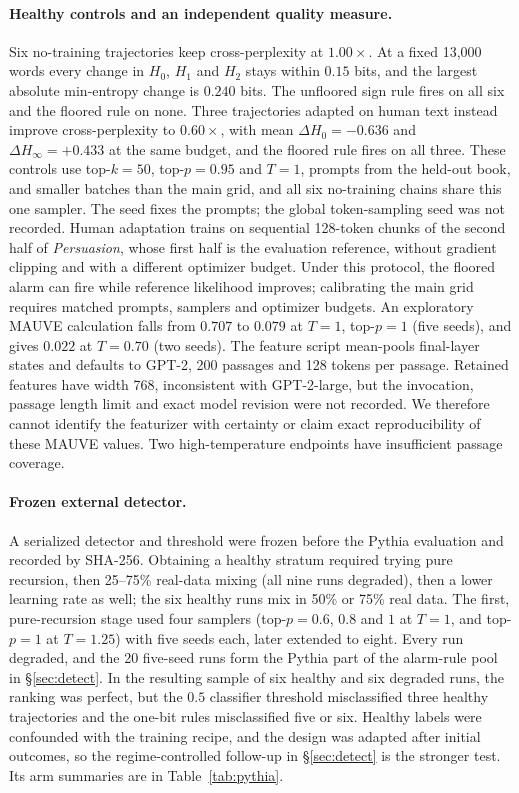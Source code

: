 \documentclass[10pt]{article}
\theoremstyle{plain}
\theoremstyle{definition}
\begin{document}
\paragraph{Healthy controls and an independent quality measure.} Six no-training trajectories
keep cross-perplexity at $1.00\times$. At a fixed 13,000 words every change in $H_0$, $H_1$ and
$H_2$ stays within $0.15$ bits, and the largest absolute min-entropy change is $0.240$ bits. The
unfloored sign rule fires on all six and the floored rule on none. Three trajectories adapted on
human text instead improve cross-perplexity to $0.60\times$, with mean $\Delta H_0=-0.636$ and
$\Delta H_\infty=+0.433$ at the same budget, and the floored rule fires on all three. These
controls use top-$k=50$, top-$p=0.95$ and $T=1$, prompts from the held-out book, and smaller
batches than the main grid, and all six no-training chains share this one sampler. The seed fixes
the prompts; the global token-sampling seed was not recorded. Human adaptation trains on
sequential 128-token chunks of the second half of \emph{Persuasion}, whose first half is the
evaluation reference, without gradient clipping and with a different optimizer budget. Under this protocol, the floored alarm can fire while reference likelihood improves; calibrating
the main grid requires matched prompts, samplers and optimizer budgets. An exploratory MAUVE calculation falls from $0.707$ to $0.079$
at $T=1$, top-$p=1$ (five seeds), and gives $0.022$ at $T=0.70$ (two seeds). The feature script
mean-pools final-layer states and defaults to GPT-2, 200 passages and 128 tokens per passage.
Retained features have width 768, inconsistent with GPT-2-large, but the invocation, passage
length limit and exact model revision were not recorded. We therefore cannot identify the featurizer with
certainty or claim exact reproducibility of these MAUVE values. Two high-temperature endpoints
have insufficient passage coverage.

\paragraph{Frozen external detector.} A serialized detector and threshold were frozen before the
Pythia evaluation and recorded by SHA-256. Obtaining a healthy stratum required trying pure
recursion, then 25--75\% real-data mixing (all nine runs degraded), then a lower learning rate as well; the six healthy
runs mix in 50\% or 75\% real data. The first,
pure-recursion stage used four samplers (top-$p=0.6$, $0.8$ and $1$ at $T=1$, and top-$p=1$ at
$T=1.25$) with five seeds each, later extended to eight. Every run degraded, and the 20 five-seed
runs form the Pythia part of the alarm-rule pool in \S\ref{sec:detect}. In the resulting sample
of six healthy and six degraded runs, the ranking was perfect, but the $0.5$ classifier threshold
misclassified three healthy trajectories and the one-bit rules misclassified five or six. Healthy
labels were confounded with the training recipe, and the design was adapted after initial
outcomes, so the regime-controlled follow-up in \S\ref{sec:detect} is the stronger test. Its arm
summaries are in Table~\ref{tab:pythia}.
\end{document}

